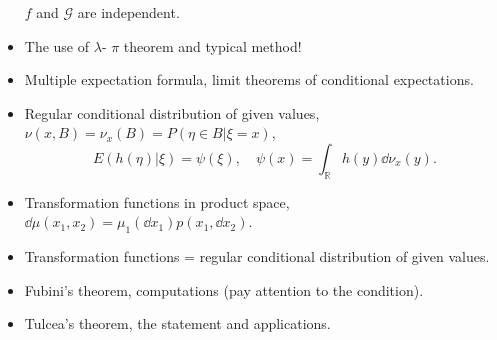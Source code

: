 \begin{itemize}
		$f$ and $\mathscr{G}$ are independent.
	\item The use of $\lambda$- $\pi$ theorem and typical method!
	\item Multiple expectation formula, limit theorems of conditional expectations.
	\item Regular conditional distribution of given values,
		$\nu(x, B) = \nu_x(B) = P(\eta\in B|\xi = x)$,
		\[
		E(h(\eta)|\xi) = \psi(\xi), \quad \psi(x) = \int_{\mathbb{R}}h(y)\dd \nu_x(y).
		\]
	\item Transformation functions in product space,
		$\dd \mu(x_1, x_2) = \mu_1(\dd x_1)p(x_1, \dd x_2)$.
	\item Transformation functions = regular conditional distribution of given values.
	\item Fubini's theorem, computations (pay attention to the condition).
	\item Tulcea's theorem, the statement and applications.
\end{itemize}
